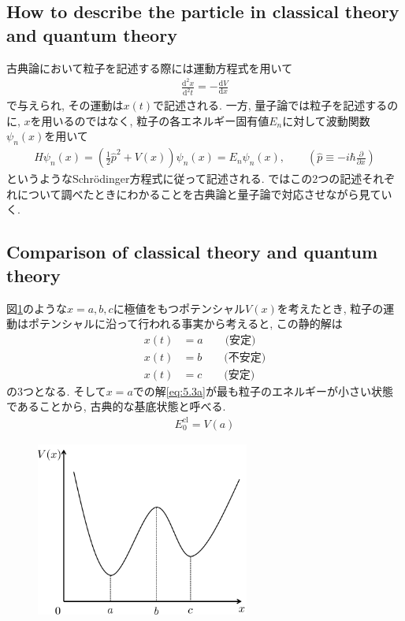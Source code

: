 \documentclass[dvipdfmx,11pt,a4paper,oneside,openany]{jsbook}
\begin{document}
\subsection{How to describe the particle in classical theory and quantum theory}
古典論において粒子を記述する際には運動方程式を用いて
\begin{align}
    \frac{\mathrm{d^2}x}{\mathrm{d^2}t}=-\frac{\mathrm{d}V}{\mathrm{d}x}
\end{align}
で与えられ, その運動は$x(t)$で記述される. 一方, 量子論では粒子を記述するのに, $x$を用いるのではなく, 粒子の各エネルギー固有値$E_n$に対して波動関数$\psi_n(x)$を用いて
\begin{align}
    H\psi_n(x)=\left(\frac{1}{2}\hat{p}^2+V(x)\right)\psi_n(x)=E_n\psi_n(x), \qquad \left(\hat{p}\equiv -i\hbar\frac{\partial}{\partial x}\right)
\end{align}
というようなSchr\"{o}dinger方程式に従って記述される. ではこの2つの記述それぞれについて調べたときにわかることを古典論と量子論で対応させながら見ていく.


\subsection{Comparison of classical theory and quantum theory}
図\ref{fig1}のような$x=a, b, c$に極値をもつポテンシャル$V(x)$を考えたとき, 粒子の運動はポテンシャルに沿って行われる事実から考えると, この静的解は
\begin{subequations}
    \begin{align}
        x(t) & =a\qquad \text{(安定)}\label{eq:5.3a} \\
        x(t) & =b \qquad \text{(不安定)}             \\
        x(t) & =c \qquad \text{(安定)}
    \end{align}
\end{subequations}
の3つとなる. そして$x=a$での解\eqref{eq:5.3a}が最も粒子のエネルギーが小さい状態であることから, 古典的な基底状態と呼べる.
\begin{align}
    E_0^{\text{cl}}=V(a)
\end{align}

\setcounter{figure}{8}
\begin{figure}[H]
    \centering
    \includegraphics[width=7cm]{figure/fig1.png}
    \caption{}
    \label{fig1}
\end{figure}
\end{document}
